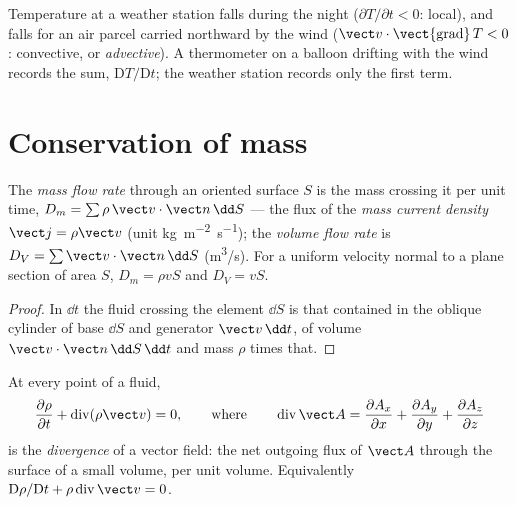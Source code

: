 \begin{example}\label{ex:b2:fluid-kinematics:weather}
Temperature at a weather station falls during the night ($\partial T/
\partial t < 0$: local), and falls for an air parcel carried northward by
the wind ($\vect v\cdot\operatorname{\vect{grad}}T < 0$: convective, or
\emph{advective}). A thermometer on a balloon drifting with the wind
records the sum, $\mathrm DT/\mathrm Dt$; the weather station records only
the first term.
\end{example}

\section{Conservation of mass}

\begin{definition}\label{def:b2:fluid-kinematics:flowrate}
The \emph{mass flow rate} through an oriented surface $S$ is the mass
crossing it per unit time, $D_m = \sum\rho\,\vect v\cdot\vect n\,\dd S$ ---
the flux of the \emph{mass current density} $\vect j = \rho\vect v$ (unit
\unit{kg.m^{-2}.s^{-1}}); the \emph{volume flow rate} is $D_V = \sum\vect v
\cdot\vect n\,\dd S$ (\unit{m^3/s}). For a uniform velocity normal to a plane
section of area $S$, $D_m = \rho vS$ and $D_V = vS$.
\end{definition}

\begin{proof}
In $\dd t$ the fluid crossing the element $\dd S$ is that contained in
the oblique cylinder of base $\dd S$ and generator $\vect v\,\dd t$, of
volume $\vect v\cdot\vect n\,\dd S\,\dd t$ and mass $\rho$ times that.
\end{proof}

\begin{theorem}\label{thm:b2:fluid-kinematics:continuity}
At every point of a fluid,
\[
\frac{\partial\rho}{\partial t} + \operatorname{div}(\rho\vect v) = 0 ,
\qquad\text{where}\qquad
\operatorname{div}\vect A = \frac{\partial A_x}{\partial x} + \frac{\partial A_y}{\partial y} +
\frac{\partial A_z}{\partial z}
\]
is the \emph{divergence} of a vector field: the net outgoing flux of
$\vect A$ through the surface of a small volume, per unit volume.
Equivalently $\mathrm D\rho/\mathrm Dt + \rho\operatorname{div}\vect v = 0$.
\end{theorem}

